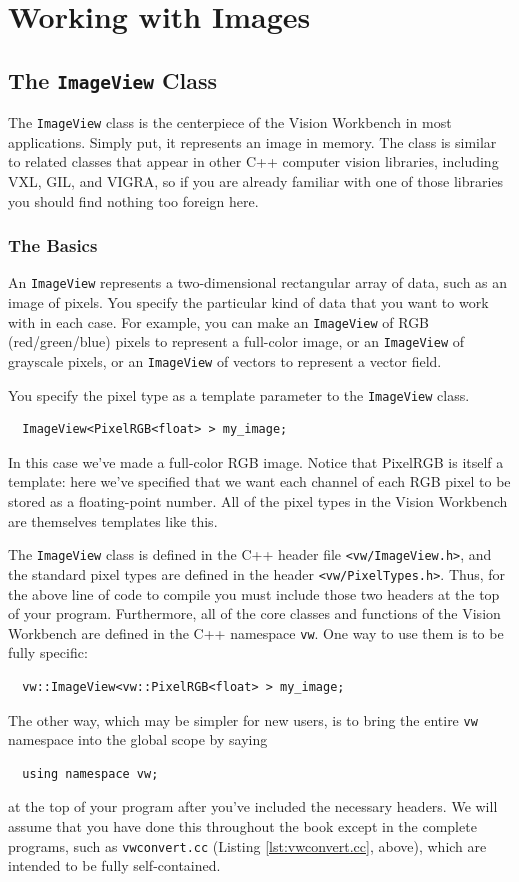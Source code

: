 \chapter{Working with Images}

\section{The {\tt ImageView} Class}

The \verb#ImageView# class is the centerpiece of the Vision Workbench 
in most applications.  Simply put, it represents an image in memory. 
The class is similar to related classes that appear in other C++ computer 
vision libraries, including VXL, GIL, and VIGRA, so if you are already 
familiar with one of those libraries you should find nothing too 
foreign here.

\subsection{The Basics}
An \verb#ImageView# represents a two-dimensional rectangular array of
data, such as an image of pixels.  You specify the particular kind of
data that you want to work with in each case.  For example, you can
make an \verb#ImageView# of RGB (red/green/blue) pixels to represent a
full-color image, or an \verb#ImageView# of grayscale pixels, or an 
\verb#ImageView# of vectors to represent a vector field.

You specify the pixel type as a template parameter to the \verb#ImageView# 
class.
\begin{verbatim}
  ImageView<PixelRGB<float> > my_image;
\end{verbatim}
In this case we've made a full-color RGB image.  Notice that PixelRGB
is itself a template: here we've specified that we want each channel
of each RGB pixel to be stored as a floating-point number.  All of the
pixel types in the Vision Workbench are themselves templates like
this.

The \verb#ImageView# class is defined in the C++ header file
\verb#<vw/ImageView.h>#, and the standard pixel types are defined in
the header \verb#<vw/PixelTypes.h>#.  Thus, for the above line of code 
to compile you must include those two headers at the top of your 
program.  Furthermore, all of the core classes and functions of the 
Vision Workbench are defined in the C++ namespace \verb#vw#.  One way 
to use them is to be fully specific:
\begin{verbatim}
  vw::ImageView<vw::PixelRGB<float> > my_image;
\end{verbatim}
The other way, which may be simpler for new users, is to bring the 
entire \verb#vw# namespace into the global scope by saying 
\begin{verbatim}
  using namespace vw;
\end{verbatim}
at the top of your program after you've included the necessary
headers.  We will assume that you have done this throughout the book
except in the complete programs, such as \verb#vwconvert.cc# (Listing
\ref{lst:vwconvert.cc}, above), which are intended to be fully
self-contained.

